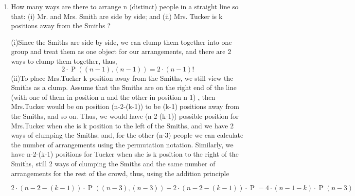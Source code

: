 \documentclass[12pt]{amsart}
\DeclareMathOperator{\perm}{P}
\begin{document}
\begin{enumerate}
\bigskip
\item
How many ways are there to arrange n (distinct) people in a straight line so
that: (i) Mr. and Mrs. Smith are side by side; and (ii) Mrs. Tucker is k positions
away from the Smiths ?
\bigskip

(i)Since the Smiths are side by side, we can clump them together into one group and treat them as one object for our arrangements, and there are 2 ways to clump them together, thus, 
\begin{displaymath}
2\cdot \perm((n-1),(n-1))=2\cdot{(n-1)!}
\end{displaymath}
\smallskip
(ii)To place Mrs.Tucker k position away from the Smiths, we still view the Smiths as a clump. Assume that the Smiths are on the right end of the line (with one of them in position n and the other in position n-1) , then Mrs.Tucker would be on position (n-2-(k-1)) to be (k-1) positions away from the Smiths, and so on. Thus, we would have (n-2-(k-1)) possible position for Mrs.Tucker when she is k position to the left of the Smiths, and we have 2 ways of clumping the Smiths; and, for the other (n-3) people we can calculate the number of arrangements using the permutation notation. Similarly, we have n-2-(k-1) positions for Tucker when she is k position to the right of the Smiths, still 2 ways of clumping the Smiths and the same number of arrangements for the rest of the crowd, thus, using the addition principle

\begin{displaymath}
2\cdot (n-2-(k-1))\cdot\perm((n-3),(n-3))+2\cdot(n-2-(k-1))\cdot\perm=4\cdot(n-1-k)\cdot\perm(n-3)
\end{displaymath}





\end{enumerate}
\end{document}
